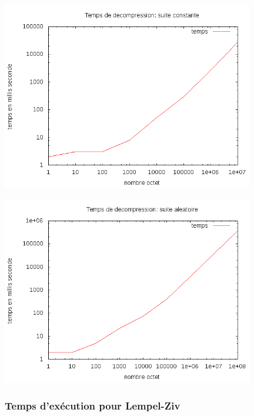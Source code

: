 \documentclass{report}
\begin{document}
\begin{center}
\includegraphics[width=11cm]{tempsDhC.png}
\end{center}
\begin{center}
\includegraphics[width=11cm]{tempsDhA.png}
\end{center}

\subsubsection*{Temps d’exécution pour Lempel-Ziv}
\end{document}
